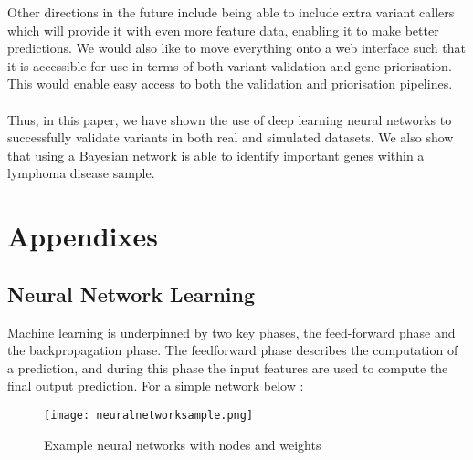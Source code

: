 \documentclass{article}
\begin{document}
Other directions in the future include being able to include extra variant callers which will provide it with even more feature data, enabling it to make better predictions. We would also like to move everything onto a web interface such that it is accessible for use in terms of both variant validation and gene priorisation. This would enable easy access to both the validation and priorisation pipelines. \\\\

Thus, in this paper, we have shown the use of deep learning neural networks to successfully validate variants in both real and simulated datasets. We also show that using a Bayesian network is able to identify important genes within a lymphoma disease sample.	


\newpage
\section{Appendixes}

\subsection{Neural Network Learning}
Machine learning is underpinned by two key phases, the feed-forward phase and the backpropagation phase. The feedforward phase describes the computation of a prediction, and during this phase the input features are used to compute the final output prediction. For a simple network below :

\begin{figure}[H]
\texttt{[image: neuralnetworksample.png]}
\caption{Example neural networks with nodes and weights}
\centering
\end{figure}
\end{document}

